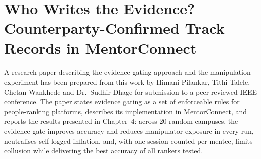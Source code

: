 \documentclass[12pt,a4paper]{report}
\begin{document}
\section{Who Writes the Evidence? Counterparty-Confirmed Track Records in MentorConnect}
A research paper describing the evidence-gating approach and the manipulation experiment has been prepared from this work by Himani Pilankar, Tithi Talele, Chetan Wankhede and Dr.\ Sudhir Dhage for submission to a peer-reviewed IEEE conference. The paper states evidence gating as a set of enforceable rules for people-ranking platforms, describes its implementation in MentorConnect, and reports the results presented in Chapter~4: across 20 random campuses, the evidence gate improves accuracy and reduces manipulator exposure in every run, neutralises self-logged inflation, and, with one session counted per mentee, limits collusion while delivering the best accuracy of all rankers tested.



\end{document}
